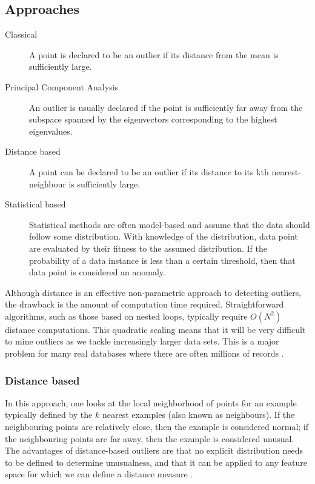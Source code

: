 \subsection{Approaches}

\begin{description}

\item[Classical] A point is declared to be an outlier if its distance from the 
mean is sufficiently large.

\item[Principal Component Analysis] An outlier is usually declared if the point 
is sufficiently far away from the subspace spanned by the eigenvectors 
corresponding to the highest eigenvalues.

\item[Distance based] A point can be declared to be an outlier if its distance 
to its kth nearest-neighbour is sufficiently large.

\item[Statistical based] Statistical methods are often model-based and assume 
that the data should follow some distribution. With knowledge of the 
distribution, data point are evaluated by their fitness to the assumed 
distribution. If the probability of a data instance is less than a certain 
threshold, then that data point is considered an anomaly.

\end{description}

Although distance is an effective non-parametric approach to detecting outliers,
the drawback is the amount of computation time required. Straightforward 
algorithms, such as those based on nested loops, typically require $O(N^{2})$
distance computations. This quadratic scaling means that it will be very 
difficult to mine outliers as we tackle increasingly larger data sets. This is a 
major problem for many real databases where there are often millions of records 
\cite{Bay:2003}.

\subsubsection{Distance based}
In this approach, one looks at the local neighborhood of points for an example 
typically defined by the $k$ nearest examples (also known as neighbours). If the
neighbouring points are relatively close, then the example is considered normal;
if the neighbouring points are far away, then the example is considered unusual.
The advantages of distance-based outliers are that no explicit distribution 
needs to be defined to determine unusualness, and that it can be applied to any 
feature space for which we can define a distance measure \cite{Bay:2003}.

